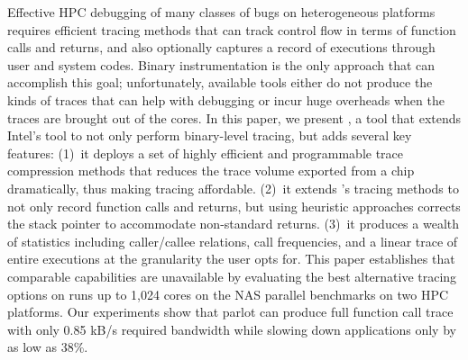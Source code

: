 Effective HPC debugging of many classes of bugs on heterogeneous
platforms requires efficient tracing methods that can track control
flow in terms of function calls and returns, and also optionally
captures a record of executions through user and system codes.
%
Binary instrumentation is the only approach that can accomplish this
goal; unfortunately, available tools either do not produce the kinds
of traces that can help with debugging or incur huge overheads when
the traces are brought out of the cores.
%
In this paper, we present \parlot,  a tool that extends Intel's \pin
tool to not only perform binary-level tracing, but adds several  key
features: (1)~it deploys a set of highly efficient and programmable
trace compression methods that reduces the trace volume exported 
from a chip dramatically, thus making tracing affordable.
(2)~it extends \pin's tracing methods to not only record function
calls and returns, but using heuristic approaches corrects the
stack pointer to accommodate non-standard returns.
(3)~it produces a wealth of statistics including caller/callee
relations, call frequencies, and a linear trace of entire executions
at the granularity the user opts for.
%
This paper establishes that comparable capabilities are 
unavailable by evaluating the best alternative tracing options
on runs up to 1,024 cores on the NAS parallel benchmarks on 
two HPC platforms.
%
Our experiments show that parlot can produce full function call trace with only 0.85 kB/s required bandwidth while slowing down applications only by as low as 38\%. %
%
